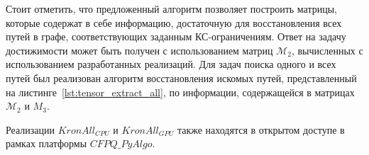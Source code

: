 Стоит отметить, что предложенный алгоритм позволяет построить матрицы, которые содержат в себе информацию, достаточную для восстановления всех путей в графе, соответствующих заданным КС-ограничениям. Ответ на задачу достижимости может быть получен с использованием матриц $\mathcal{M}_2$, вычисленных с использованием разработанных реализаций. Для задач поиска одного и всех путей был реализован алгоритм восстановления искомых путей, представленный на листинге~\ref{lst:tensor_extract_all}, по информации, содержащейся в матрицах $\mathcal{M}_2$ и $M_3$.

Реализации $\textit{KronAll}_{\textit{CPU}}$ и $\textit{KronAll}_{\textit{GPU}}$ также находятся в открытом доступе в рамках платформы $\textit{CFPQ\_PyAlgo}$.


\clearpage
